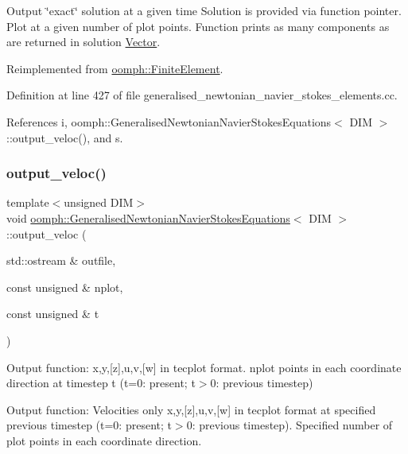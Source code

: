 Output \char`\"{}exact\char`\"{} solution at a given time Solution is provided via function pointer. Plot at a given number of plot points. Function prints as many components as are returned in solution \hyperlink{classoomph_1_1Vector}{Vector}. 

Reimplemented from \hyperlink{classoomph_1_1FiniteElement_a2a8426dccd57b927be0ae0eec00d0479}{oomph\+::\+Finite\+Element}.



Definition at line 427 of file generalised\+\_\+newtonian\+\_\+navier\+\_\+stokes\+\_\+elements.\+cc.



References i, oomph\+::\+Generalised\+Newtonian\+Navier\+Stokes\+Equations$<$ D\+I\+M $>$\+::output\+\_\+veloc(), and s.

\mbox{\label{classoomph_1_1GeneralisedNewtonianNavierStokesEquations_afe07a58574ea59b9c83d33c96b92a98b}} 
\subsubsection{\texorpdfstring{output\+\_\+veloc()}{output\_veloc()}}
{\footnotesize\ttfamily template$<$unsigned D\+IM$>$ \\
void \hyperlink{classoomph_1_1GeneralisedNewtonianNavierStokesEquations}{oomph\+::\+Generalised\+Newtonian\+Navier\+Stokes\+Equations}$<$ D\+IM $>$\+::output\+\_\+veloc (\begin{DoxyParamCaption}\item[{std\+::ostream \&}]{outfile,  }\item[{const unsigned \&}]{nplot,  }\item[{const unsigned \&}]{t }\end{DoxyParamCaption})}



Output function\+: x,y,\mbox{[}z\mbox{]},u,v,\mbox{[}w\mbox{]} in tecplot format. nplot points in each coordinate direction at timestep t (t=0\+: present; t$>$0\+: previous timestep) 

Output function\+: Velocities only x,y,\mbox{[}z\mbox{]},u,v,\mbox{[}w\mbox{]} in tecplot format at specified previous timestep (t=0\+: present; t$>$0\+: previous timestep). Specified number of plot points in each coordinate direction. 

